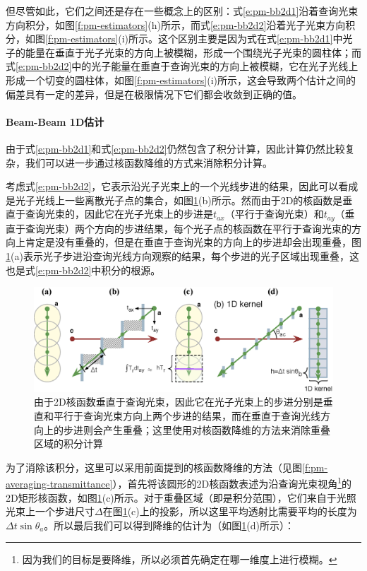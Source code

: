 但尽管如此，它们之间还是存在一些概念上的区别：式\ref{e:pm-bb2d1}沿着查询光束方向积分，如图\ref{f:pm-estimators}(h)所示，而式\ref{e:pm-bb2d2}沿着光子光束方向积分，如图\ref{f:pm-estimators}(i)所示。这个区别主要是因为式在式\ref{e:pm-bb2d1}中光子的能量在垂直于光子光束的方向上被模糊，形成一个围绕光子光束的圆柱体；而式\ref{e:pm-bb2d2}中的光子能量在垂直于查询光束的方向上被模糊，它在光子光线上形成一个切变的圆柱体，如图\ref{f:pm-estimators}(i)所示，这会导致两个估计之间的偏差具有一定的差异，但是在极限情况下它们都会收敛到正确的值。



\paragraph{Beam-Beam 1D估计}
由于式\ref{e:pm-bb2d1}和式\ref{e:pm-bb2d2}仍然包含了积分计算，因此计算仍然比较复杂，我们可以进一步通过核函数降维的方式来消除积分计算。

考虑式\ref{e:pm-bb2d2}，它表示沿光子光束上的一个光线步进的结果，因此可以看成是光子光线上一些离散光子点的集合，如图\ref{f:pm-bb1d}(b)所示。然而由于2D的核函数是垂直于查询光束的，因此它在光子光束上的步进是$t_{ax}$（平行于查询光束）和$t_{ay}$（垂直于查询光束）两个方向的步进结果，每个光子点的核函数在平行于查询光束的方向上肯定是没有重叠的，但是在垂直于查询光束的方向上的步进却会出现重叠，图\ref{f:pm-bb1d}(a)表示光子步进沿查询光线方向观察的结果，每个步进的光子区域出现重叠，这也是式\ref{e:pm-bb2d2}中积分的根源。

\begin{figure}
\begin{fullwidth}
	\includegraphics[width=\thewidth]{figures/pm/bb1d}
	\caption{由于2D核函数垂直于查询光束，因此它在光子光束上的步进分别是垂直和平行于查询光束方向上两个步进的结果，而在垂直于查询光线方向上的步进则会产生重叠；这里使用对核函数降维的方法来消除重叠区域的积分计算}
	\label{f:pm-bb1d}
\end{fullwidth}
\end{figure}

为了消除该积分，这里可以采用前面提到的核函数降维的方法（见图\ref{f:pm-averaging-transmittance}），首先将该圆形的2D核函数表述为沿查询光束视角\footnote{因为我们的目标是要降维，所以必须首先确定在哪一维度上进行模糊。}的2D矩形核函数，如图\ref{f:pm-bb1d}(c)所示。对于重叠区域（即是积分范围），它们来自于光照光束上一个步进尺寸$\Delta$在图\ref{f:pm-bb1d}(c)上的投影，所以这里平均透射比需要平均的长度为$\Delta t\sin{\theta_a}$。所以最后我们可以得到降维的估计为（如图\ref{f:pm-bb1d}(d)所示）：

